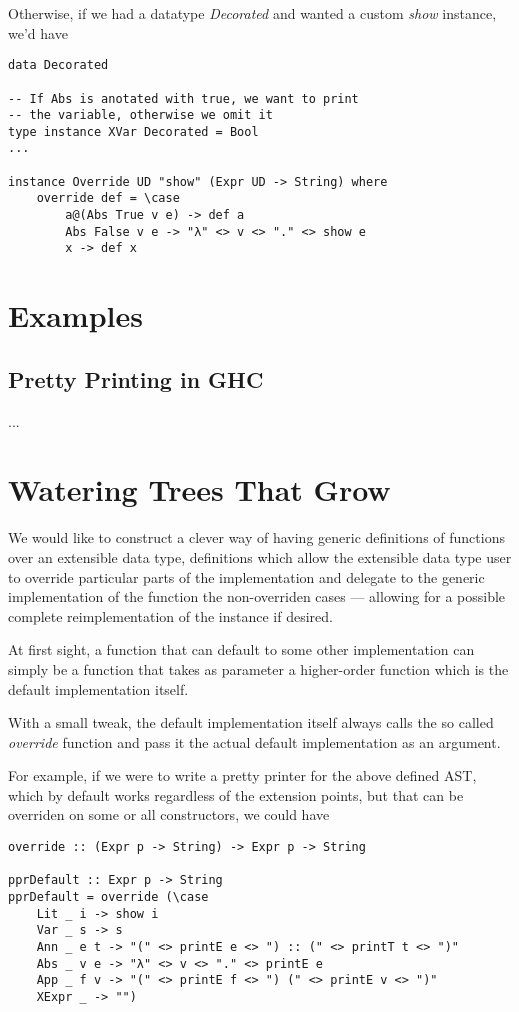 \documentclass{article}
\begin{document}
Otherwise, if we had a datatype \emph{Decorated} and wanted a custom \emph{show}
instance, we'd have

\begin{lstlisting}
data Decorated

-- If Abs is anotated with true, we want to print
-- the variable, otherwise we omit it
type instance XVar Decorated = Bool
...

instance Override UD "show" (Expr UD -> String) where
    override def = \case
        a@(Abs True v e) -> def a
        Abs False v e -> "λ" <> v <> "." <> show e
        x -> def x
\end{lstlisting}


\section{Examples}

\subsection{Pretty Printing in GHC}

...

\section{Watering Trees That Grow}

We would like to construct a clever way of having generic definitions of
functions over an extensible data type, definitions which allow the extensible
data type user to override particular parts of the implementation and delegate
to the generic implementation of the function the non-overriden cases ---
allowing for a possible complete reimplementation of the instance if desired.

At first sight, a function that can default to some other implementation can
simply be a function that takes as parameter a higher-order function which is
the default implementation itself.

With a small tweak, the default implementation itself always calls the
so called \emph{override} function and pass it the actual default implementation as
an argument.

For example, if we were to write a pretty printer for the above defined AST,
which by default works regardless of the extension points, but that can be
overriden on some or all constructors, we could have

\begin{lstlisting}
override :: (Expr p -> String) -> Expr p -> String

pprDefault :: Expr p -> String
pprDefault = override (\case 
    Lit _ i -> show i
    Var _ s -> s
    Ann _ e t -> "(" <> printE e <> ") :: (" <> printT t <> ")"
    Abs _ v e -> "λ" <> v <> "." <> printE e
    App _ f v -> "(" <> printE f <> ") (" <> printE v <> ")"
    XExpr _ -> "")
\end{lstlisting}
\end{document}

